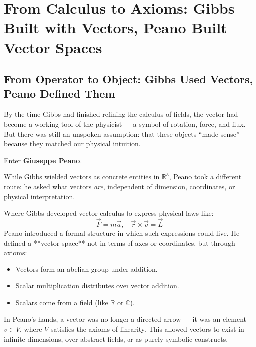 \section{From Calculus to Axioms: Gibbs Built with Vectors, Peano Built Vector Spaces}

\subsection{From Operator to Object: Gibbs Used Vectors, Peano Defined Them}

By the time Gibbs had finished refining the calculus of fields, the vector had become a working tool of the physicist — a symbol of rotation, force, and flux.  
But there was still an unspoken assumption: that these objects “made sense” because they matched our physical intuition.

Enter \textbf{Giuseppe Peano}.

While Gibbs wielded vectors as concrete entities in \( \mathbb{R}^3 \), Peano took a different route: he asked what vectors \textit{are}, independent of dimension, coordinates, or physical interpretation.

\bigskip

Where Gibbs developed vector calculus to express physical laws like:
\[
\vec{F} = m\vec{a}, \quad \vec{r} \times \vec{v} = \vec{L}
\]
Peano introduced a formal structure in which such expressions could live. He defined a **vector space** not in terms of axes or coordinates, but through axioms:

\begin{itemize}
    \item Vectors form an abelian group under addition.
    \item Scalar multiplication distributes over vector addition.
    \item Scalars come from a field (like \( \mathbb{R} \) or \( \mathbb{C} \)).
\end{itemize}

In Peano’s hands, a vector was no longer a directed arrow — it was an element \( v \in V \), where \( V \) satisfies the axioms of linearity.  
This allowed vectors to exist in infinite dimensions, over abstract fields, or as purely symbolic constructs.

\bigskip

